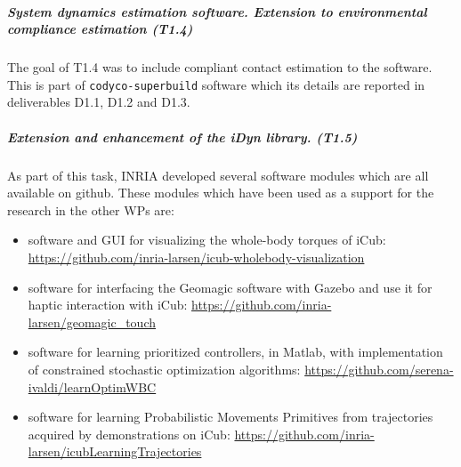 

\subparagraph*{System dynamics estimation software. Extension to
environmental compliance estimation (T1.4)}

The goal of T1.4 was to include compliant contact estimation to the software.
This is part of \texttt{codyco-superbuild} software which its details are
reported in deliverables D1.1, D1.2 and D1.3.


\subparagraph*{Extension and enhancement of the iDyn library. (T1.5)}

As part of this task, INRIA developed several software modules which are all
available on github.  These modules which have been used as a support for the
research in the other WPs are:
\begin{itemize}
  \item software and GUI for visualizing the whole-body torques of iCub:
    \url{https://github.com/inria-larsen/icub-wholebody-visualization}
  \item software for interfacing the Geomagic software with Gazebo and use it
    for haptic interaction with iCub:
    \url{https://github.com/inria-larsen/geomagic_touch}
  \item software for learning prioritized controllers, in Matlab, with
    implementation of constrained stochastic optimization algorithms:
    \url{https://github.com/serena-ivaldi/learnOptimWBC}
  \item software for learning Probabilistic Movements Primitives from
    trajectories acquired by demonstrations on iCub:
    \url{https://github.com/inria-larsen/icubLearningTrajectories}
\end{itemize}


